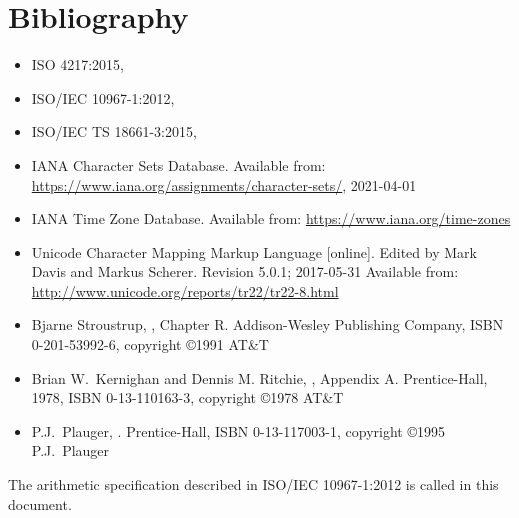 
\chapter{Bibliography}

\begin{itemize}
\renewcommand{\labelitemi}{---}
\item
  ISO 4217:2015,
\item
  ISO/IEC 10967-1:2012,
\item
  ISO/IEC TS 18661-3:2015,
\item
  IANA Character Sets Database.
  Available from:\newline
  \url{https://www.iana.org/assignments/character-sets/}, 2021-04-01
\item
  IANA Time Zone Database.
  Available from: \url{https://www.iana.org/time-zones}
\item
  Unicode Character Mapping Markup Language [online].
  Edited by Mark Davis and Markus Scherer. Revision 5.0.1; 2017-05-31
  Available from: \url{http://www.unicode.org/reports/tr22/tr22-8.html}
\item
  Bjarne Stroustrup,
  , Chapter R\@.
  Addison-Wesley Publishing Company, ISBN 0-201-53992-6, copyright \copyright 1991 AT\&T
\item
  Brian W.\ Kernighan and Dennis M. Ritchie,
  , Appendix A\@.
  Prentice-Hall, 1978, ISBN 0-13-110163-3, copyright \copyright 1978 AT\&T
\item
  P.J.\ Plauger,
  .
  Prentice-Hall, ISBN 0-13-117003-1, copyright \copyright 1995 P.J.\ Plauger
\end{itemize}

The arithmetic specification described in ISO/IEC 10967-1:2012 is
called  in this document.

\let\realglossitem\glossitem
\renewcommand{\glossitem}[4]{\hangpara{4em}{1}\realglossitem{#1}{#2}{#3}{#4}}

